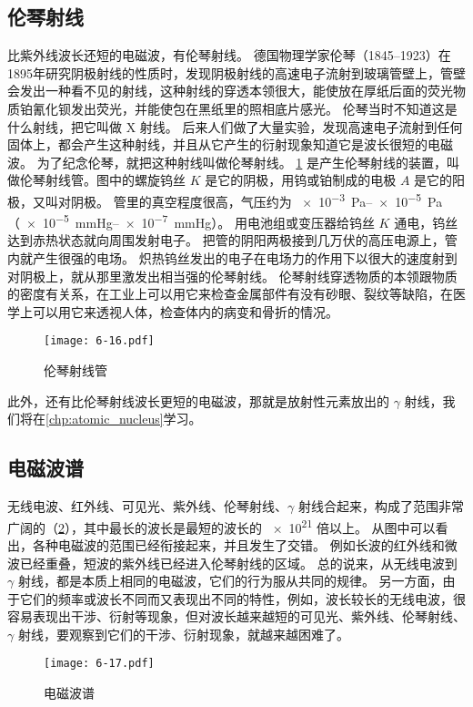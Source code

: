 \subsection{伦琴射线}
比紫外线波长还短的电磁波，有伦琴射线。
德国物理学家伦琴（1845--1923）在1895年研究阴极射线的性质时，发现阴极射线的高速电子流射到玻璃管壁上，管壁会发出一种看不见的射线，这种射线的穿透本领很大，能使放在厚纸后面的荧光物质铂氰化钡发出荧光，并能使包在黑纸里的照相底片感光。
伦琴当时不知道这是什么射线，把它叫做 X 射线。
后来人们做了大量实验，发现高速电子流射到任何固体上，都会产生这种射线，并且从它产生的衍射现象知道它是波长很短的电磁波。
为了纪念伦琴，就把这种射线叫做伦琴射线。
\cref{fig:6-16} 是产生伦琴射线的装置，叫做伦琴射线管。图中的螺旋钨丝 $K$ 是它的阴极，用钨或铂制成的电极 $A$ 是它的阳极，又叫对阴极。
管里的真空程度很高，气压约为 \qtyrange{e-3}{e-5}{Pa}（\qtyrange{e-5}{e-7}{mmHg}）。
用电池组或变压器给钨丝 $K$ 通电，钨丝达到赤热状态就向周围发射电子。
把管的阴阳两极接到几万伏的高压电源上，管内就产生很强的电场。
炽热钨丝发出的电子在电场力的作用下以很大的速度射到对阴极上，就从那里激发出相当强的伦琴射线。
伦琴射线穿透物质的本领跟物质的密度有关系，在工业上可以用它来检查金属部件有没有砂眼、裂纹等缺陷，在医学上可以用它来透视人体，检查体内的病变和骨折的情况。
\begin{figure}
  \texttt{[image: 6-16.pdf]}
  \caption{伦琴射线管}\label{fig:6-16}
\end{figure}

此外，还有比伦琴射线波长更短的电磁波，那就是放射性元素放出的 $\gamma$ 射线，我们将在\cref{chp:atomic_nucleus}学习。

\subsection{电磁波谱}

无线电波、红外线、可见光、紫外线、伦琴射线、$\gamma$ 射线合起来，构成了范围非常广阔的（\cref{fig:6-17}），其中最长的波长是最短的波长的 \num{e21} 倍以上。
从图中可以看出，各种电磁波的范围已经衔接起来，并且发生了交错。
例如长波的红外线和微波已经重叠，短波的紫外线已经进入伦琴射线的区域。
总的说来，从无线电波到 $\gamma$ 射线，都是本质上相同的电磁波，它们的行为服从共同的规律。
另一方面，由于它们的频率或波长不同而又表现出不同的特性，例如，波长较长的无线电波，很容易表现出干涉、衍射等现象，但对波长越来越短的可见光、紫外线、伦琴射线、$\gamma$ 射线，要观察到它们的干涉、衍射现象，就越来越困难了。

\begin{figure}
  \texttt{[image: 6-17.pdf]}
  \caption{电磁波谱}\label{fig:6-17}
\end{figure}

